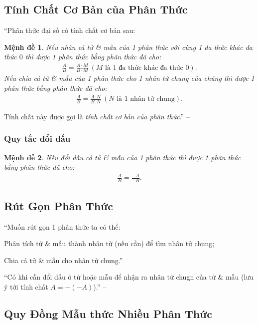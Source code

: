 \documentclass{article}
\numberwithin{equation}{section}
\newtheorem{menhde}{Mệnh đề}[section]
\begin{document}
\subsection{Tính Chất Cơ Bản của Phân Thức}
``Phân thức đại số có tính chất cơ bản sau:

\begin{menhde}
	Nếu nhân cả tử \& mẫu của 1 phân thức với cùng 1 đa thức khác đa thức $0$ thì được 1 phân thức bằng phân thức đã cho:
	\begin{align*}
		\frac{A}{B} = \frac{A\cdot M}{B\cdot M}\ (M\mbox{ là 1 đa thức khác đa thức } 0).
	\end{align*}
	Nếu chia cả tử \& mẫu của 1 phân thức cho 1 nhân tử chung của chúng thì được 1 phân thức bằng phân thức đã cho:
	\begin{align*}
		\frac{A}{B} = \frac{A:N}{B:N}\ (N\mbox{ là 1 nhân tử chung}).
	\end{align*}
\end{menhde}
Tính chất này được gọi là \textit{tính chất cơ bản của phân thức}.'' -- \cite[p. 37]{SGK_Toan_8_tap_1}

\subsubsection{Quy tắc đổi dấu}

\begin{menhde}
	Nếu đổi dấu cả tử \& mẫu của 1 phân thức thì được 1 phân thức bằng phân thức đã cho:
	\begin{align*}
		\frac{A}{B} = \frac{-A}{-B}.
	\end{align*}
\end{menhde}

\subsection{Rút Gọn Phân Thức}
``Muốn rút gọn 1 phân thức ta có thể:
\begin{enumerate*}
	\item Phân tích tử \& mẫu thành nhân tử (nếu cần) để tìm nhân tử chung;
	\item Chia cả tử \& mẫu cho nhân tử chung.''
\end{enumerate*}
``Có khi cần đổi dấu ở tử hoặc mẫu để nhận ra nhân tử chugn của tử \& mẫu (lưu ý tới tính chất $A = -(-A)$).'' -- \cite[p. 39]{SGK_Toan_8_tap_1}

\subsection{Quy Đồng Mẫu thức Nhiều Phân Thức}
\end{document}
